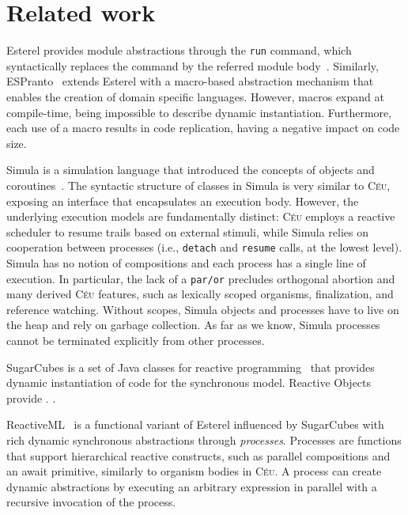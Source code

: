 \documentclass{acm_proc_article-sp}
\newcommand{\CEU}{\textsc{C\'{e}u}\xspace}
\newcommand{\code}[1] {{\small{\texttt{#1}}}}
\newcommand{\1}{\;}
\newcommand{\2}{\;\;}
\newcommand{\3}{\;\;\;}
\newcommand{\5}{\;\;\;\;\;}
\begin{document}
\section{Related work}
\label{sec.related}


Esterel provides module abstractions through the \code{run} command, which 
syntactically replaces the command by the referred module 
body~\cite{esterel.primer}.
%
Similarly, ESPranto~\cite{espranto} extends Esterel with a macro-based 
abstraction mechanism that enables the creation of domain specific languages.
%
However, macros expand at compile-time, being impossible to describe dynamic 
instantiation.
Furthermore, each use of a macro results in code replication, having a negative 
impact on code size.

Simula is a simulation language that introduced the concepts of objects and 
coroutines~\cite{simula}.
%
The syntactic structure of classes in Simula is very similar to \CEU, exposing 
an interface that encapsulates an execution body.
%
However, the underlying execution models are fundamentally distinct:
\CEU employs a reactive scheduler to resume trails based on external stimuli, 
while Simula relies on cooperation between processes (i.e., \code{detach} and 
\code{resume} calls, at the lowest level).
%
Simula has no notion of compositions and each process has a single line of 
execution.
In particular, the lack of a \code{par/or} precludes orthogonal abortion and 
many derived \CEU features, such as lexically scoped organisms, finalization, 
and reference watching.
%
Without scopes, Simula objects and processes have to live on the heap and rely 
on garbage collection.
As far as we know, Simula processes cannot be terminated explicitly from other 
processes.
%

SugarCubes is a set of Java classes for reactive programming~\cite{sugarcubes} 
that provides dynamic instantiation of code for the synchronous model.
%
Reactive Objects provide .
\cite{rp.oo}.

ReactiveML~\cite{rml} is a functional variant of Esterel influenced by 
SugarCubes with rich dynamic synchronous abstractions through \emph{processes}.
Processes are functions that support hierarchical reactive constructs, such as 
parallel compositions and an await primitive, similarly to organism bodies in 
\CEU.
A process can create dynamic abstractions by executing an arbitrary expression 
in parallel with a recursive invocation of the process.
\end{document}
